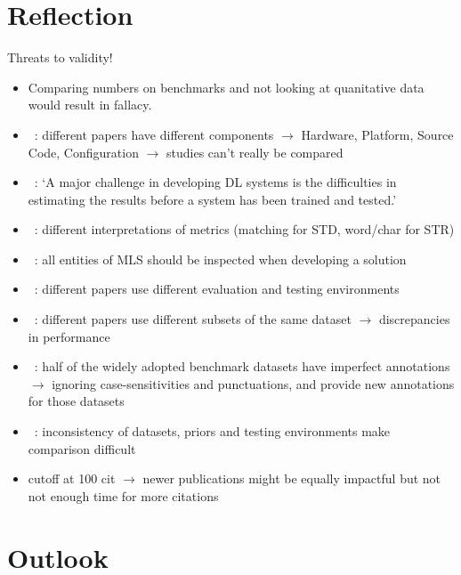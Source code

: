\section{Reflection}
Threats to validity!
\begin{itemize}
    \item Comparing numbers on benchmarks and not looking at quanitative data would result in fallacy.
    \item~\cite{arpteg_software_2018}: different papers have different components
        $\rightarrow$ Hardware, Platform, Source Code, Configuration
        $\rightarrow$ studies can't really be compared
    \item~\cite{arpteg_software_2018}: `A major challenge in developing DL systems is the
        difficulties in estimating the results before a system has been trained and tested.'
    \item~\cite{long_scene_2021}: different interpretations of metrics (matching for \ac{STD},
        word/char for \ac{STR})
    \item~\cite{siebert_construction_2021,nakamichi_requirements-driven_2020}: all entities of
        \ac{MLS} should be inspected when developing a solution
    \item~\cite{baek_what_2019}: different papers use different evaluation and testing environments
    \item~\cite{baek_what_2019}: different papers use different subsets of the same dataset
        $\rightarrow$ discrepancies in performance
    \item~\cite{long_unrealtext_2020}: half of the widely adopted benchmark datasets have imperfect
        annotations $\rightarrow$ ignoring case-sensitivities and punctuations, and provide new
        annotations for those datasets
    \item~\cite{chen_text_2021}: inconsistency of datasets, priors and testing environments make
        comparison difficult
    \item cutoff at 100 cit $\rightarrow$ newer publications might be equally impactful but not
        not enough time for more citations
\end{itemize}

\section{Outlook}

